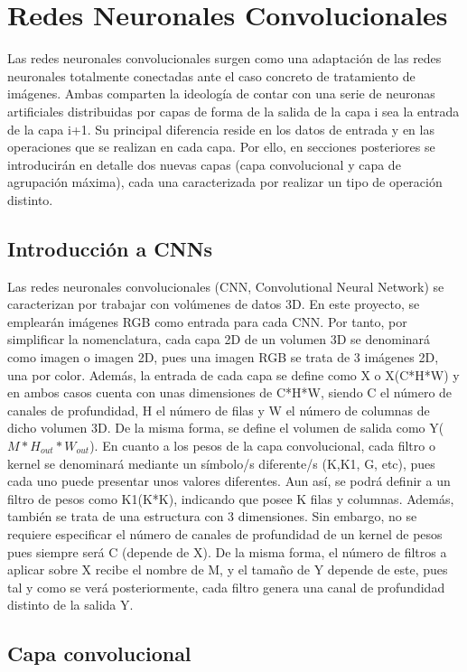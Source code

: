 \section{Redes Neuronales Convolucionales}

Las redes neuronales convolucionales surgen como una adaptación de las redes neuronales totalmente conectadas ante el caso concreto de tratamiento de imágenes. Ambas comparten la ideología de contar con una serie de neuronas artificiales distribuidas por capas de forma de la salida de la capa i sea la entrada de la capa i+1. Su principal diferencia reside en los datos de entrada y en las operaciones que se realizan en cada capa. Por ello, en secciones posteriores se introducirán en detalle dos nuevas capas (capa convolucional y capa de agrupación máxima), cada una caracterizada por realizar un tipo de operación distinto.

\subsection{Introducción a CNNs}

Las redes neuronales convolucionales (CNN, Convolutional Neural Network) se caracterizan por trabajar con volúmenes de datos 3D. En este proyecto, se emplearán imágenes RGB como entrada para cada CNN. Por tanto, por simplificar la nomenclatura, cada capa 2D de un volumen 3D se denominará como imagen o imagen 2D, pues una imagen RGB se trata de 3 imágenes 2D, una por color. Además, la entrada de cada capa se define como X o X(C*H*W) y en ambos casos cuenta con unas dimensiones de C*H*W, siendo C el número de canales de profundidad, H el número de filas y W el número de columnas de dicho volumen 3D. De la misma forma, se define el volumen de salida como Y($M*H_{out}*W_{out}$). En cuanto a los pesos de la capa convolucional, cada filtro o kernel se denominará mediante un símbolo/s diferente/s (K,K1, G, etc), pues cada uno puede presentar unos valores diferentes. Aun así, se podrá definir a un filtro de pesos como K1(K*K), indicando que posee K filas y columnas. Además, también se trata de una estructura con 3 dimensiones. Sin embargo, no se requiere especificar el número de canales de profundidad de un kernel de pesos pues siempre será C (depende de X). De la misma forma, el número de filtros a aplicar sobre X recibe el nombre de M, y el tamaño de Y depende de este, pues tal y como se verá posteriormente, cada filtro genera una canal de profundidad distinto de la salida Y. 

\subsection{Capa convolucional}

